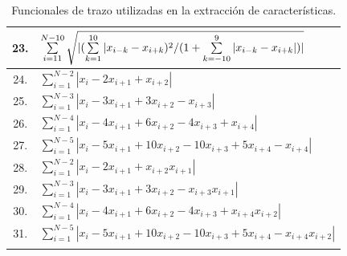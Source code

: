 \begin{longtable}{ |c|l| }
    	23.&$\sum \limits \limits_{i=11}^{N-10}\sqrt{|(\sum \limits_{k=1}^{10}{|{x_{i-k}-x_{i+k}})^2/(1+\sum \limits_{k=-10}^{9}{|{x_{i-k}-x_{i+k}}|}})|}$  \\ \hline
    	24.&$\sum \limits_{i=1}^{N-2}{|{x_{i}-2x_{i+1}+x_{i+2}}|}$  \\ \hline
    	25.&$\sum \limits_{i=1}^{N-3}{|{x_{i}-3x_{i+1}+3x_{i+2}-x_{i+3}}|}$  \\ \hline
    	26.&$\sum \limits_{i=1}^{N-4}{|{x_{i}-4x_{i+1}+6x_{i+2}-4x_{i+3}+x_{i+4}}|}$  \\ \hline
    	27.&$\sum \limits_{i=1}^{N-5}{|{x_{i}-5x_{i+1}+10x_{i+2}-10x_{i+3}+5x_{i+4}-x_{i+4}}|}$  \\ \hline
    	28.&$\sum \limits_{i=1}^{N-2}{|{x_{i}-2x_{i+1}+x_{i+2}}x_{i+1}|}$  \\ \hline
    	29.&$\sum \limits_{i=1}^{N-3}{|{x_{i}-3x_{i+1}+3x_{i+2}-x_{i+3}}x_{i+1}|}$  \\ \hline
    	30.&$\sum \limits_{i=1}^{N-4}{|{x_{i}-4x_{i+1}+6x_{i+2}-4x_{i+3}+x_{i+4}}x_{i+2}|}$  \\ \hline
    	31.&$\sum \limits_{i=1}^{N-5}{|{x_{i}-5x_{i+1}+10x_{i+2}-10x_{i+3}+5x_{i+4}-x_{i+4}}x_{i+2}|}$ \\ \hline
    \caption{Funcionales de trazo utilizadas en la extracción de características.}
    \label{tab:ft}
\end{longtable}


